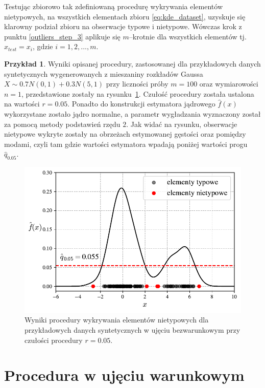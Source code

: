 \documentclass[12pt,a4paper,oneside]{book}
\theoremstyle{definition}
\newtheorem{exmp}{Przykład}[chapter]
\begin{document}
Testując zbiorowo tak zdefiniowaną procedurę wykrywania elementów nietypowych, na wszystkich elementach zbioru \eqref{eq:kde_dataset}, uzyskuje się klarowny podział zbioru na obserwacje typowe i nietypowe. Wówczas krok z punktu \ref{outliers_step_3} aplikuje się $m$--krotnie dla wszystkich elementów  tj. $x_{test} = x_i$, gdzie $i=1,2,...,m$.

\begin{exmp}
Wyniki opisanej procedury, zastosowanej dla przykładowych danych syntetycznych wygenerowanych z mieszaniny rozkładów Gaussa $X \sim 0.7 N(0,1) + 0.3 N(5,1)$ przy liczności próby $m=100$ oraz wymiarowości $n=1$, przedstawione zostały na rysunku~\ref{fig:outliers_detection_example}. Czułość procedury została ustalona na wartości $r=0.05$. Ponadto do konstrukcji estymatora jądrowego $\hat{f}(x)$ wykorzystane zostało jądro normalne, a parametr wygładzania wyznaczony został za pomocą metody podstawień rzędu $2$. Jak widać na rysunku, obserwacje nietypowe wykryte zostały na obrzeżach estymowanej gęstości oraz pomiędzy modami, czyli tam gdzie wartości estymatora wpadają poniżej wartości progu $\hat{q}_{0.05}$.
\begin{figure}[H]
    \centering
    \includegraphics[scale=0.65]{outliers_detection_example}
    \vspace{-0.5cm} 
    \caption{Wyniki procedury wykrywania elementów nietypowych dla przykładowych danych syntetycznych w ujęciu bezwarunkowym przy czułości procedury $r=0.05$.}
    \label{fig:outliers_detection_example}
\end{figure}
\end{exmp}

\section{Procedura w ujęciu warunkowym}
\end{document}
